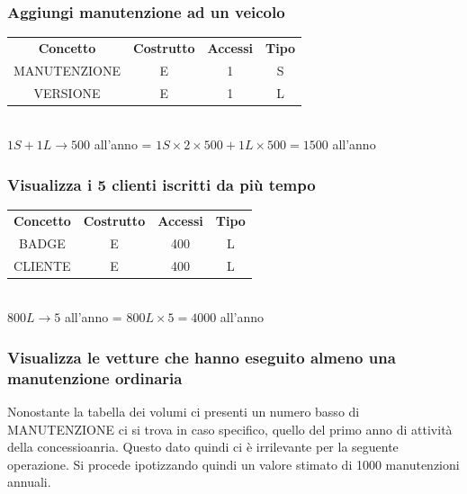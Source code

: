 \documentclass[12pt]{article}
\begin{document}
\subsubsection{Aggiungi manutenzione ad un veicolo} \label{Aggiungi manutenzione
ad un veicolo}

\begin{table}[H]
    \centering
    \begin{tabular}{c c c c}
        \rowcolor{red!20!}
        \textbf{Concetto} & \textbf{Costrutto} & \textbf{Accessi} &
        \textbf{Tipo}\\
        MANUTENZIONE & E & 1 & S \\
        VERSIONE & E & 1 & L \\
    \end{tabular}\\
    \( 1S  + 1L \rightarrow  500\) all'anno = \( 1S \times 2 \times 500 + 1L
    \times 500 = 1500 \) all'anno
\end{table}

\subsubsection{Visualizza i 5 clienti iscritti da più tempo} \label{Visualizza i
5 clienti iscritti da più tempo}

\begin{table}[H]
    \centering
    \begin{tabular}{c c c c}
        \rowcolor{red!20!}
        \textbf{Concetto} & \textbf{Costrutto} & \textbf{Accessi} &
        \textbf{Tipo}\\
        BADGE & E & 400 & L \\
        CLIENTE & E & 400 & L \\
    \end{tabular}\\
    \( 800L \rightarrow 5 \) all'anno = \( 800L \times 5 = 4000\) all'anno
\end{table}

\subsubsection{Visualizza le vetture che hanno eseguito almeno una manutenzione
ordinaria} \label{Visualizza le vetture che hanno eseguito almeno una
manutenzione ordinaria}

Nonostante la tabella dei volumi ci presenti un numero
basso di MANUTENZIONE ci si trova in caso specifico, quello del primo anno di
attività della concessioanria. Questo dato quindi ci è irrilevante per la
seguente operazione. Si procede ipotizzando quindi un valore stimato di 1000
manutenzioni annuali. 
\end{document}
